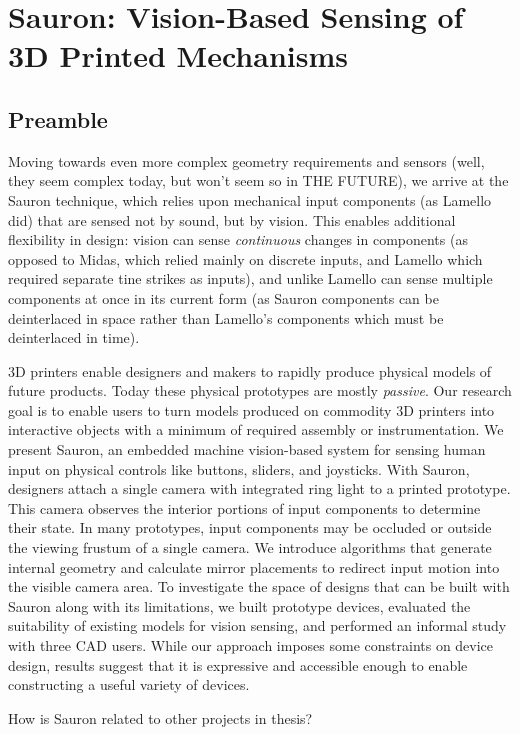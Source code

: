 \chapter{Sauron: Vision-Based Sensing of 3D Printed Mechanisms}

\section{Preamble}

Moving towards even more complex geometry requirements and sensors (well, they seem complex today, but won't seem so in THE FUTURE), we arrive at the Sauron technique, which relies upon mechanical input components (as Lamello did) that are sensed not by sound, but by vision. This enables additional flexibility in design: vision can sense \emph{continuous} changes in components (as opposed to Midas, which relied mainly on discrete inputs, and Lamello which required separate tine strikes as inputs), and unlike Lamello can sense multiple components at once in its current form (as Sauron components can be deinterlaced in space rather than Lamello's components which must be deinterlaced in time).

3D printers enable designers and makers to rapidly produce physical models of future products. Today these physical prototypes are mostly {\em passive}. Our research goal is to enable users to turn models produced on commodity 3D printers into interactive objects with a minimum of required assembly or instrumentation.  We present Sauron, an embedded machine vision-based system for sensing human input on physical controls like buttons, sliders, and joysticks.  With Sauron, designers attach a single camera with integrated ring light to a printed prototype.  This camera observes the interior portions of input components to determine their state.  In many prototypes, input components may be occluded or outside the viewing frustum of a single camera.  We introduce algorithms that generate internal geometry and calculate mirror placements to redirect input motion into the visible camera area.    
To investigate the space of designs that can be built with Sauron along with its limitations, we built prototype devices, evaluated the suitability of existing models for vision sensing, and performed an informal study with three CAD users. While our approach imposes some constraints on device design, results suggest that it is expressive and accessible enough to enable constructing a useful variety of devices.

How is Sauron related to other projects in thesis?

